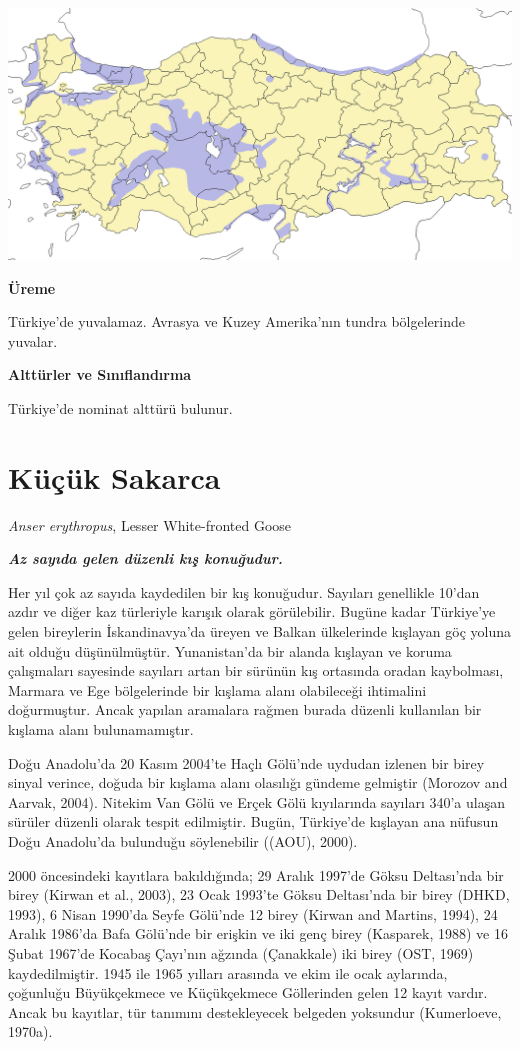 \documentclass[
  a4paper,
  DIV=11,
  numbers=noendperiod]{scrartcl}
\begin{document}
\includegraphics{images/harita_Anser albifrons.png}

\textbf{Üreme}

Türkiye'de yuvalamaz. Avrasya ve Kuzey Amerika'nın tundra bölgelerinde
yuvalar.

\textbf{Alttürler ve Sınıflandırma}

Türkiye'de nominat alttürü bulunur.

\section{Küçük Sakarca}\label{kuxfcuxe7uxfck-sakarca}

\emph{Anser erythropus}, Lesser White-fronted Goose

\textbf{\emph{Az sayıda gelen düzenli kış konuğudur.}}

Her yıl çok az sayıda kaydedilen bir kış konuğudur. Sayıları genellikle
10'dan azdır ve diğer kaz türleriyle karışık olarak görülebilir. Bugüne
kadar Türkiye'ye gelen bireylerin İskandinavya'da üreyen ve Balkan
ülkelerinde kışlayan göç yoluna ait olduğu düşünülmüştür. Yunanistan'da
bir alanda kışlayan ve koruma çalışmaları sayesinde sayıları artan bir
sürünün kış ortasında oradan kaybolması, Marmara ve Ege bölgelerinde bir
kışlama alanı olabileceği ihtimalini doğurmuştur. Ancak yapılan
aramalara rağmen burada düzenli kullanılan bir kışlama alanı
bulunamamıştır.

Doğu Anadolu'da 20 Kasım 2004'te Haçlı Gölü'nde uydudan izlenen bir
birey sinyal verince, doğuda bir kışlama alanı olasılığı gündeme
gelmiştir (Morozov and Aarvak, 2004). Nitekim Van Gölü ve Erçek Gölü
kıyılarında sayıları 340'a ulaşan sürüler düzenli olarak tespit
edilmiştir. Bugün, Türkiye'de kışlayan ana nüfusun Doğu Anadolu'da
bulunduğu söylenebilir ((AOU), 2000).

2000 öncesindeki kayıtlara bakıldığında; 29 Aralık 1997'de Göksu
Deltası'nda bir birey (Kirwan et al., 2003), 23 Ocak 1993'te Göksu
Deltası'nda bir birey (DHKD, 1993), 6 Nisan 1990'da Seyfe Gölü'nde 12
birey (Kirwan and Martins, 1994), 24 Aralık 1986'da Bafa Gölü'nde bir
erişkin ve iki genç birey (Kasparek, 1988) ve 16 Şubat 1967'de Kocabaş
Çayı'nın ağzında (Çanakkale) iki birey (OST, 1969) kaydedilmiştir. 1945
ile 1965 yılları arasında ve ekim ile ocak aylarında, çoğunluğu
Büyükçekmece ve Küçükçekmece Göllerinden gelen 12 kayıt vardır. Ancak bu
kayıtlar, tür tanımını destekleyecek belgeden yoksundur (Kumerloeve,
1970a).
\end{document}
